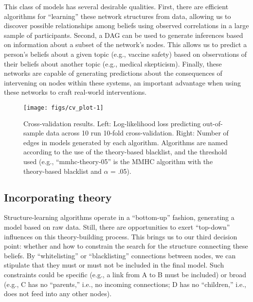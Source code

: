 \documentclass[10pt, letterpaper]{article}
\newenvironment{CodeChunk}{}{}
\begin{document}
This class of models has several desirable qualities. First, there are
efficient algorithms for ``learning'' these network structures from
data, allowing us to discover possible relationships among beliefs using
observed correlations in a large sample of participants. Second, a DAG
can be used to generate inferences based on information about a subset
of the network's nodes. This allows us to predict a person's beliefs
about a given topic (e.g., vaccine safety) based on observations of
their beliefs about another topic (e.g., medical skepticism). Finally,
these networks are capable of generating predictions about the
consequences of intervening on nodes within these systems, an important
advantage when using these networks to craft real-world interventions.

\begin{CodeChunk}
\begin{figure*}[h]

{\centering \texttt{[image: figs/cv\_plot-1]} 

}

\caption[Cross-validation results]{Cross-validation results. Left: Log-likelihood loss predicting out-of-sample data across 10 run 10-fold cross-validation. Right: Number of edges in models generated by each algorithm. Algorithms are named according to the use of the theory-based blacklist, and the threshold used (e.g., “mmhc-theory-05” is the MMHC algorithm with the theory-based blacklist and $\alpha$ = .05).}\label{fig:cv_plot}
\end{figure*}
\end{CodeChunk}

\subsection{Incorporating theory}\label{incorporating-theory}

Structure-learning algorithms operate in a ``bottom-up'' fashion,
generating a model based on raw data. Still, there are opportunities to
exert ``top-down'' influences on this theory-building process. This
brings us to our third decision point: whether and how to constrain the
search for the structure connecting these beliefs. By ``whitelisting''
or ``blacklisting'' connections between nodes, we can stipulate that
they must or must not be included in the final model. Such constraints
could be specific (e.g., a link from A to B must be included) or broad
(e.g., C has no ``parents,'' i.e., no incoming connections; D has no
``children,'' i.e., does not feed into any other nodes).
\end{document}
